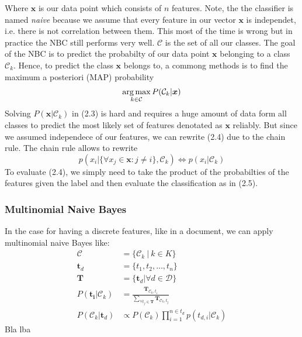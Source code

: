 Where $\boldsymbol{x}$ is our data point which consists of $n$ features. Note, the the classifier is named \textsl{naive} because we assume that every feature in our vector $\boldsymbol{x}$ is independet, i.e. there is not correlation between them. This most of the time is wrong but in practice the NBC still performs very well. $\mathcal{C}$ is the set of all our classes. The goal of the NBC is to predict the probabilty of our data point $\boldsymbol{x}$ belonging to a class $\mathcal{C}_k$. Hence, to predict the class $\boldsymbol{x}$ belongs to, a commong methods is to find the maximum a posteriori (MAP) probability
\begin{gather}
  \operatorname*{arg\,max}_{k \in \mathcal{C}} P(\mathcal{C}_k|\boldsymbol{x})
\end{gather}
 Solving $P(\boldsymbol{x} |\mathcal{C}_k)$ in (2.3) is hard and requires a huge amount of data form all classes to predict the most likely set of features denotated as $\boldsymbol{x}$ reliably. But since we assumed independece of our features, we can rewrite (2.4) due to the chain rule. The chain rule allows to rewrite
 $$p(x_i| \{\forall x_j \in \boldsymbol{x} : j \neq i \}, \mathcal{C}_k) \Leftrightarrow p(x_i|\mathcal{C}_k)$$
 To evaluate (2.4), we simply need to take the product of the probabilties of the features given the label and then evaluate the classification as in (2.5).

\subsubsection{Multinomial Naive Bayes}
In the case for having a discrete features, like in a document, we can apply multinomial naive Bayes like:
\begin{align}
  \mathcal{C} &= \{\mathcal{C}_k \: | \: k \in K \} \\
  \boldsymbol{t}_d &= \{t_1, t_2, \dots, t_n\} \\
  \boldsymbol{T} &= \{\boldsymbol{t}_d | \forall d \in \mathcal{D}\} \\
  P(\boldsymbol{t_{i}}|\mathcal{C}_k) &= \frac{\boldsymbol{T}_{\mathcal{C}_k,t_{i}}}{\sum_{\forall t_j \in \boldsymbol{T}}\boldsymbol{T}_{\mathcal{C}_k,t_j}} \\
  P(\mathcal{C}_k|\boldsymbol{t}_d) &\propto P(\mathcal{C}_k) \prod_{i=1}^{n \in t_{d}}  p(t_{d,i}|\mathcal{C}_k)
\end{align}
Bla lba
